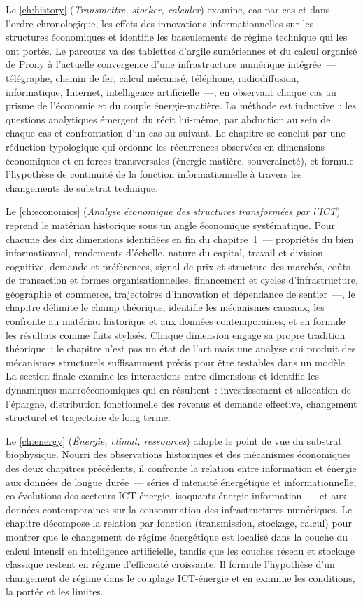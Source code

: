 Le \autoref{ch:history} (\emph{Transmettre, stocker, calculer}) examine, cas par cas et dans l'ordre chronologique, les effets des innovations informationnelles sur les structures économiques et identifie les basculements de régime technique qui les ont portés. Le parcours va des tablettes d'argile sumériennes et du calcul organisé de Prony à l'actuelle convergence d'une infrastructure numérique intégrée~--- télégraphe, chemin de fer, calcul mécanisé, téléphone, radiodiffusion, informatique, Internet, intelligence artificielle~---, en observant chaque cas au prisme de l'économie et du couple énergie-matière. La méthode est inductive~: les questions analytiques émergent du récit lui-même, par abduction au sein de chaque cas et confrontation d'un cas au suivant. Le chapitre se conclut par une réduction typologique qui ordonne les récurrences observées en dimensions économiques et en forces transversales (énergie-matière, souveraineté), et formule l'hypothèse de continuité de la fonction informationnelle à travers les changements de substrat technique.

Le \autoref{ch:economics} (\emph{Analyse économique des structures transformées par l'ICT}) reprend le matériau historique sous un angle économique systématique. Pour chacune des dix dimensions identifiées en fin du chapitre~1~--- propriétés du bien informationnel, rendements d'échelle, nature du capital, travail et division cognitive, demande et préférences, signal de prix et structure des marchés, coûts de transaction et formes organisationnelles, financement et cycles d'infrastructure, géographie et commerce, trajectoires d'innovation et dépendance de sentier~---, le chapitre délimite le champ théorique, identifie les mécanismes causaux, les confronte au matériau historique et aux données contemporaines, et en formule les résultats comme faits stylisés. Chaque dimension engage sa propre tradition théorique~; le chapitre n'est pas un état de l'art mais une analyse qui produit des mécanismes structurels suffisamment précis pour être testables dans un modèle. La section finale examine les interactions entre dimensions et identifie les dynamiques macroéconomiques qui en résultent~: investissement et allocation de l'épargne, distribution fonctionnelle des revenus et demande effective, changement structurel et trajectoire de long terme.

Le \autoref{ch:energy} (\emph{Énergie, climat, ressources}) adopte le point de vue du substrat biophysique. Nourri des observations historiques et des mécanismes économiques des deux chapitres précédents, il confronte la relation entre information et énergie aux données de longue durée~--- séries d'intensité énergétique et informationnelle, co-évolutions des secteurs ICT-énergie, isoquants énergie-information~--- et aux données contemporaines sur la consommation des infrastructures numériques. Le chapitre décompose la relation par fonction (transmission, stockage, calcul) pour montrer que le changement de régime énergétique est localisé dans la couche du calcul intensif en intelligence artificielle, tandis que les couches réseau et stockage classique restent en régime d'efficacité croissante. Il formule l'hypothèse d'un changement de régime dans le couplage ICT-énergie et en examine les conditions, la portée et les limites.

